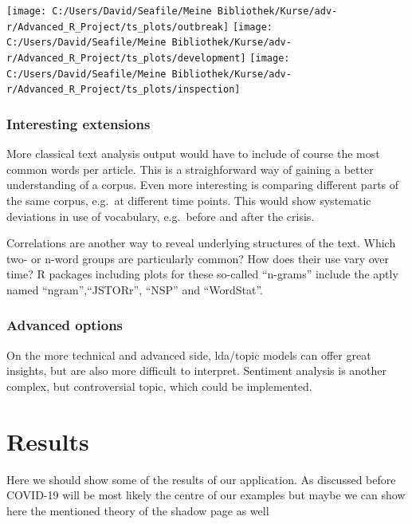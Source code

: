 \documentclass[12pt,a4paper]{article}
\let\origfigure\figure
\let\endorigfigure\endfigure
\renewenvironment{figure}[1][2] {
    \expandafter\origfigure\expandafter[H]
} {
    \endorigfigure
}
\begin{document}
\begin{figure}

{\centering \texttt{[image: C:/Users/David/Seafile/Meine Bibliothek/Kurse/adv-r/Advanced\_R\_Project/ts\_plots/outbreak]} \texttt{[image: C:/Users/David/Seafile/Meine Bibliothek/Kurse/adv-r/Advanced\_R\_Project/ts\_plots/development]} \texttt{[image: C:/Users/David/Seafile/Meine Bibliothek/Kurse/adv-r/Advanced\_R\_Project/ts\_plots/inspection]} 

}

\end{figure}

\hypertarget{interesting-extensions}{%
\subsubsection{Interesting extensions}\label{interesting-extensions}}

More classical text analysis output would have to include of course the
most common words per article. This is a straighforward way of gaining a
better understanding of a corpus. Even more interesting is comparing
different parts of the same corpus, e.g.~at different time points. This
would show systematic deviations in use of vocabulary, e.g.~before and
after the crisis.

Correlations are another way to reveal underlying structures of the
text. Which two- or n-word groups are particularly common? How does
their use vary over time? R packages including plots for these so-called
\enquote{n-grams} include the aptly named
\enquote{ngram},\enquote{JSTORr}, \enquote{NSP} and \enquote{WordStat}.

\hypertarget{advanced-options}{%
\subsubsection{Advanced options}\label{advanced-options}}

On the more technical and advanced side, lda/topic models can offer
great insights, but are also more difficult to interpret. Sentiment
analysis is another complex, but controversial topic, which could be
implemented.

\hypertarget{results}{%
\section{Results}\label{results}}

Here we should show some of the results of our application. As discussed
before COVID-19 will be most likely the centre of our examples but maybe
we can show here the mentioned theory of the shadow page as well
\end{document}
